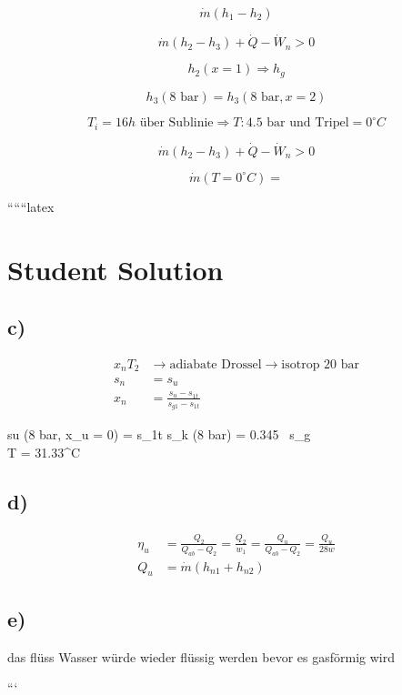 \[
\dot{m} (h_1 - h_2)
\]

\[
\dot{m} (h_2 - h_3) + \dot{Q} - \dot{W}_n > 0
\]

\[
h_2 (x = 1) \Rightarrow h_g
\]

\[
h_3 (8 \text{ bar}) = h_3 (8 \text{ bar}, x = 2)
\]

\[
T_i = 16 h \text{ über Sublinie} \Rightarrow T: 4.5 \text{ bar und Tripel} = 0^\circ C
\]

\[
\dot{m} (h_2 - h_3) + \dot{Q} - \dot{W}_n > 0
\]

\[
\dot{m} (T = 0^\circ C) =
\]

``````latex


\section*{Student Solution}

\subsection*{c)}

\begin{align*}
x_n T_2 &\rightarrow \text{adiabate Drossel} \rightarrow \text{isotrop 20 bar} \\
s_n &= s_u \\
x_n &= \frac{s_u - s_{1t}}{s_{g1} - s_{1t}}
\end{align*}

\noindent
su (8 bar, x_u = 0) = s_{1t} \quad s_{k} (8 bar) = 0.345 \, s_g \\
\Delta T = 31.33^\circ C

\subsection*{d)}

\begin{align*}
\eta_u &= \frac{Q_2}{Q_{ab} - Q_2} = \frac{Q_2}{w_1} = \frac{Q_u}{Q_{ab} - Q_2} = \frac{Q_u}{28w} \\
Q_u &= \dot{m} (h_{n1} + h_{n2})
\end{align*}

\subsection*{e)}

das flüss Wasser würde wieder flüssig werden bevor es gasförmig wird

```